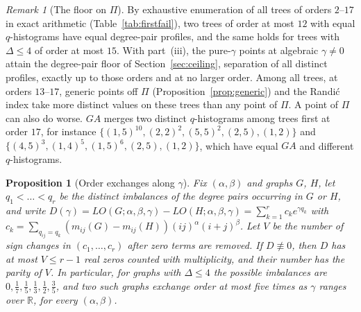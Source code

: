\documentclass[a5paper, 10pt]{article}
\theoremstyle{plain}
\newtheorem{proposition}[theorem]{Proposition}
\theoremstyle{remark}
\newtheorem*{remark}{Remark}
\theoremstyle{definition}
\begin{document}
  \begin{remark}[The floor on $\Pi$]\label{rem:floor}
  By exhaustive enumeration of all trees of orders $2$--$17$ in exact
  arithmetic (Table~\ref{tab:firstfail}), two trees
  of order at most $12$ with equal $q$-histograms have equal
  degree-pair profiles, and the same holds for trees with
  $\Delta \le 4$ of order at most $15$. With part~(iii), the
  pure-$\gamma$ points at algebraic $\gamma \neq 0$ attain the
  degree-pair floor of Section~\ref{sec:ceiling}, separation of all
  distinct profiles, exactly up to those orders and at no larger
  order. Among all trees, at orders $13$--$17$, generic points off $\Pi$
  (Proposition~\ref{prop:generic}) and the Randi\'c index take
  more distinct values on these trees than any point of $\Pi$. A point of $\Pi$ can also do
  worse. $GA$ merges two distinct $q$-histograms among trees first at
  order $17$, for instance
  $\{(1,5)^{10}, (2,2)^{2}, (5,5)^{2}, (2,5), (1,2)\}$ and
  $\{(4,5)^{3}, (1,4)^{5}, (1,5)^{6}, (2,5), (1,2)\}$, which have
  equal $GA$ and different $q$-histograms.
  \end{remark}

  \begin{proposition}[Order exchanges along $\gamma$]\label{prop:laguerre}
  Fix $(\alpha,\beta)$ and graphs $G$, $H$, let
  $q_1 < \dots < q_r$ be the distinct imbalances of the degree pairs
  occurring in $G$ or $H$, and write
  $D(\gamma) = LO(G;\alpha,\beta,\gamma) - LO(H;\alpha,\beta,\gamma)
  = \sum_{k=1}^{r} c_k e^{\gamma q_k}$ with
  $c_k = \sum_{q_{ij} = q_k} (m_{ij}(G) - m_{ij}(H))(ij)^{\alpha}(i+j)^{\beta}$.
  Let $V$ be the number of sign changes in $(c_1,\dots,c_r)$ after
  zero terms are removed. If $D \not\equiv 0$, then $D$ has at most
  $V \le r - 1$ real zeros counted with multiplicity, and their number
  has the parity of $V$. In particular, for graphs with $\Delta \le 4$
  the possible imbalances are $0, \tfrac17, \tfrac15, \tfrac13,
  \tfrac12, \tfrac35$, and two such graphs exchange order at most five times as
  $\gamma$ ranges over $\mathbb{R}$, for every $(\alpha,\beta)$.
  \end{proposition}
\end{document}
